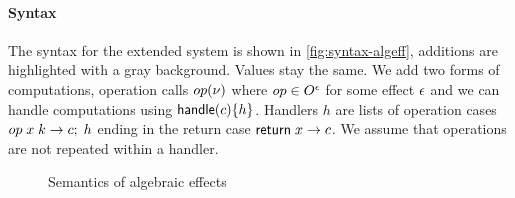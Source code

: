 {\paragraph{Syntax}
The syntax for the extended system is shown in \cref{fig:syntax-algeff}, additions are highlighted with a gray background.
Values stay the same. We add two forms of computations, operation calls $op(\nu)$ where $op \in O^{\epsilon}$ for some effect $\epsilon$ and
we can handle computations using $\mathsf{handle} (c) \{ h \}$.
Handlers $h$ are lists of operation cases $op \; x \; k \rightarrow c ; \; h$ ending in the return case $\mathsf{return}\; x \rightarrow c$.
We assume that operations are not repeated within a handler.

\begin{figure}
\caption{Semantics of algebraic effects}
\centering
{}
\end{figure}

}
